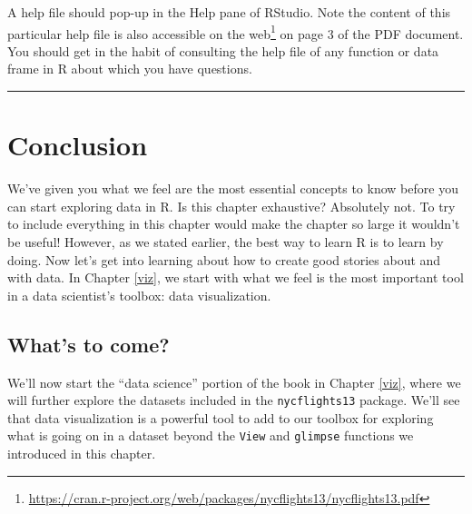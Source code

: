 \documentclass[12pt,]{krantz}
\renewcommand{\href}[2]{#2\footnote{\url{#1}}}
\theoremstyle{definition}
\theoremstyle{definition}
\theoremstyle{definition}
\theoremstyle{remark}
\begin{document}
A help file should pop-up in the Help pane of RStudio. Note the content
of this particular help file is also accessible on the
\href{https://cran.r-project.org/web/packages/nycflights13/nycflights13.pdf}{web}
on page 3 of the PDF document. You should get in the habit of consulting
the help file of any function or data frame in R about which you have
questions.

\begin{center}\rule{0.5\linewidth}{\linethickness}\end{center}

\section{Conclusion}\label{conclusion}

We've given you what we feel are the most essential concepts to know
before you can start exploring data in R. Is this chapter exhaustive?
Absolutely not. To try to include everything in this chapter would make
the chapter so large it wouldn't be useful! However, as we stated
earlier, the best way to learn R is to learn by doing. Now let's get
into learning about how to create good stories about and with data. In
Chapter \ref{viz}, we start with what we feel is the most important tool
in a data scientist's toolbox: data visualization.

\subsection{What's to come?}\label{whats-to-come}

We'll now start the ``data science'' portion of the book in Chapter
\ref{viz}, where we will further explore the datasets included in the
\texttt{nycflights13} package. We'll see that data visualization is a
powerful tool to add to our toolbox for exploring what is going on in a
dataset beyond the \texttt{View} and \texttt{glimpse} functions we
introduced in this chapter.
\end{document}
